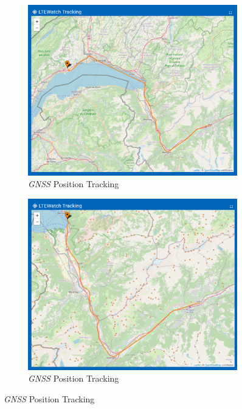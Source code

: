 \documentclass[Report.tex]{subfiles}
\begin{document}
\begin{figure}[H]
	\centering
\begin{subfigure}{.45\textwidth}
\centering
\includegraphics[width=1\textwidth]{Include/Figure/result/tracking_exemple_1.png}
\caption{\textit{GNSS} Position Tracking}
\end{subfigure}	
\begin{subfigure}{.45\textwidth}
\centering
\includegraphics[width=1\textwidth]{Include/Figure/result/tracking_exemple_4.png}
\caption{\textit{GNSS} Position Tracking}
\end{subfigure}	

\end{figure}
\end{document}
